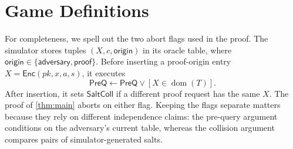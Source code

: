 \section{Game Definitions}
\label{app:games}

For completeness, we spell out the two abort flags used in the proof.  The
simulator stores tuples $(X,c,\mathsf{origin})$ in its oracle table, where
$\mathsf{origin}\in\{\mathsf{adversary},\mathsf{proof}\}$.  Before inserting a
proof-origin entry $X=\mathsf{Enc}(pk,x,a,s)$, it executes
\[
  \mathsf{PreQ}\leftarrow
  \mathsf{PreQ}\lor [X\in\operatorname{dom}(T)].
\]
After insertion, it sets $\mathsf{SaltColl}$ if a different proof request has
the same $X$.  The proof of \cref{thm:main} aborts on either flag.  Keeping the
flags separate matters because they rely on different independence claims:
the pre-query argument conditions on the adversary's current table, whereas
the collision argument compares pairs of simulator-generated salts.
